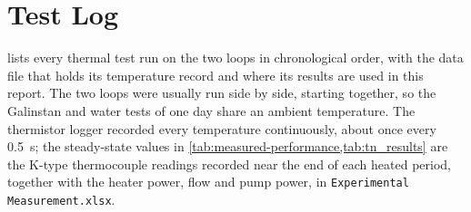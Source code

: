 \chapter{Test Log}
\label{app:test-log}

 lists every thermal test run on the two loops in
chronological order, with the data file that holds its temperature record and
where its results are used in this report. The two loops were usually run side
by side, starting together, so the Galinstan and water tests of one day share an
ambient temperature. The thermistor logger recorded every temperature
continuously, about once every \SI{0.5}{\second}; the steady-state values in
\cref{tab:measured-performance,tab:tn_results} are the K-type thermocouple
readings recorded near the end of each heated period, together with the heater
power, flow and pump power, in \texttt{Experimental Measurement.xlsx}.


